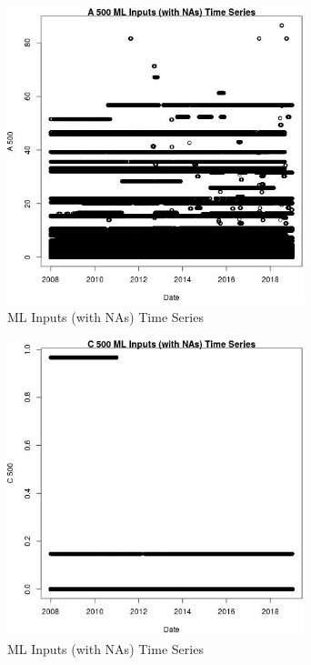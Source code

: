 \begin{figure} 
\centering  
\includegraphics[width=0.77\textwidth]{Code_Outputs/Report_ML_input_PM25_Step4_part_f_de_duplicated_aveswNAs_A_500vDate.jpg} 
\caption{\label{fig:Report_ML_input_PM25_Step4_part_f_de_duplicated_aveswNAsA_500vDate}ML Inputs (with NAs) Time Series} 
\end{figure} 
 

\begin{figure} 
\centering  
\includegraphics[width=0.77\textwidth]{Code_Outputs/Report_ML_input_PM25_Step4_part_f_de_duplicated_aveswNAs_C_500vDate.jpg} 
\caption{\label{fig:Report_ML_input_PM25_Step4_part_f_de_duplicated_aveswNAsC_500vDate}ML Inputs (with NAs) Time Series} 
\end{figure} 
 

